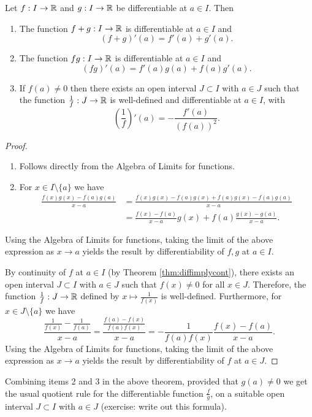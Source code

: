 \documentclass[../analysis1.tex]{subfiles}
\begin{document}
\begin{theorem}
\label{thm:altdiff}
    \begin{shaded*}
        Let $f:I\to\mathbb{R}$ and $g:I\to\mathbb{R}$ be differentiable at $a\in I$. Then
        \begin{enumerate}
            \item[1.] The function $f+g:I\to\mathbb{R}$ is differentiable at $a\in I$ and \[(f+g)'(a)=f'(a)+g'(a).\]
            \item[2.] The function $fg:I\to\mathbb{R}$ is differentiable at $a\in I$ and \[(fg)'(a)=f'(a)g(a)+f(a)g'(a).\]
            \item[3.] If $f(a)\ne 0$ then there exists an open interval $J\subset I$ with $a\in J$ such that the function $\frac{1}{f}:J\to\mathbb{R}$ is well-defined and differentiable at $a\in I$, with \[\left(\frac{1}{f}\right)'(a)=-\frac{f'(a)}{(f(a))^2}.\]
        \end{enumerate}
    \end{shaded*}
\end{theorem}
\begin{proof}
    \begin{enumerate}
        \item[1.] Follows directly from the Algebra of Limits for functions.
        \item[2.] For $x\in I\setminus\{a\}$ we have
        \begin{align*}
            \frac{f(x)g(x)-f(a)g(a)}{x-a}&=\frac{f(x)g(x)-f(a)g(x)+f(a)g(x)-f(a)g(a)}{x-a}\\
            &=\frac{f(x)-f(a)}{x-a}g(x)+f(a)\frac{g(x)-g(a)}{x-a}.
        \end{align*}
    \end{enumerate}
    Using the Algebra of Limits for functions, taking the limit of the above expression as $x\to a$ yields the result by differentiability of $f,g$ at $a\in I$.
    \item[3.] By continuity of $f$ at $a\in I$ (by Theorem \ref{thm:diffimplycont}), there exists an open interval $J\subset I$ with $a\in J$ such that $f(x)\ne 0$ for all $x\in J$. Therefore, the function $\frac{1}{f}:J\to\mathbb{R}$ defined by $x\mapsto \frac{1}{f(x)}$ is well-defined. Furthermore, for $x\in J\setminus\{a\}$ we have
    \[\frac{\frac{1}{f(x)}-\frac{1}{f(a)}}{x-a}=\frac{\frac{f(a)-f(x)}{f(a)f(x)}}{x-a}=-\frac{1}{f(a)f(x)}\frac{f(x)-f(a)}{x-a}.\]
    Using the Algebra of Limits for functions, taking the limit of the above expression as $x\to a$ yields the result by differentiability of $f$ at $a\in J$.\qedhere
\end{proof}
\begin{remark}
    Combining items 2 and 3 in the above theorem, provided that $g(a)\ne 0$ we get the usual quotient rule for the differentiable function $\frac{f}{g}$, on a suitable open interval $J\subset I$ with $a\in J$ (exercise: write out this formula).
\end{remark}
\end{document}
